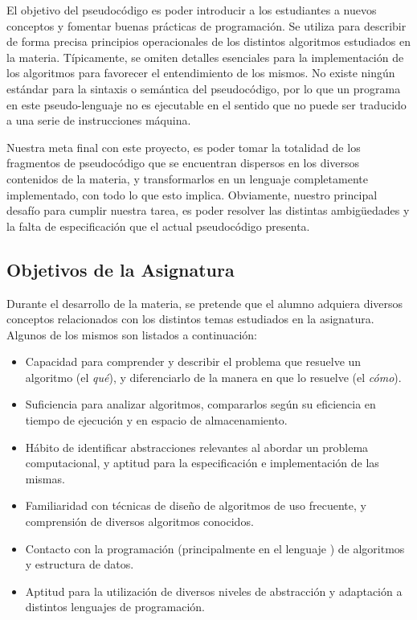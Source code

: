 El objetivo del pseudocódigo es poder introducir a los estudiantes a nuevos conceptos y fomentar buenas prácticas de programación.
Se utiliza para describir de forma precisa principios operacionales de los distintos algoritmos estudiados en la materia.
Típicamente, se omiten detalles esenciales para la implementación de los algoritmos para favorecer el entendimiento de los mismos.
No existe ningún estándar para la sintaxis o semántica del pseudocódigo, por lo que un programa en este pseudo-lenguaje  no es ejecutable en el sentido que no puede ser traducido a una serie de instrucciones máquina.

Nuestra meta final con este proyecto, es poder tomar la totalidad de los fragmentos de pseudocódigo que se encuentran dispersos en los diversos contenidos de la materia, y transformarlos en un lenguaje completamente implementado, con todo lo que esto implica.
Obviamente, nuestro principal desafío para cumplir nuestra tarea, es poder resolver las distintas ambigüedades y la falta de especificación que el actual pseudocódigo presenta.

\subsection{Objetivos de la Asignatura}

Durante el desarrollo de la materia, se pretende que el alumno adquiera diversos conceptos relacionados con los distintos temas estudiados en la asignatura.
Algunos de los mismos son listados a continuación:
\begin{itemize}
    \item Capacidad para comprender y describir el problema que resuelve un algoritmo (el \textit{qué}), y diferenciarlo de la manera en que lo resuelve (el \textit{cómo}).
    \item Suficiencia para analizar algoritmos, compararlos según su eficiencia en tiempo de ejecución y en espacio de almacenamiento.
    \item Hábito de identificar abstracciones relevantes al abordar un problema computacional, y aptitud para la especificación e implementación de las mismas.
    \item Familiaridad con técnicas de diseño de algoritmos de uso frecuente, y comprensión de diversos algoritmos conocidos.
    \item Contacto con la programación (principalmente en el lenguaje \C{}) de algoritmos y estructura de datos.
    \item Aptitud para la utilización de diversos niveles de abstracción y adaptación a distintos lenguajes de programación.
\end{itemize}

